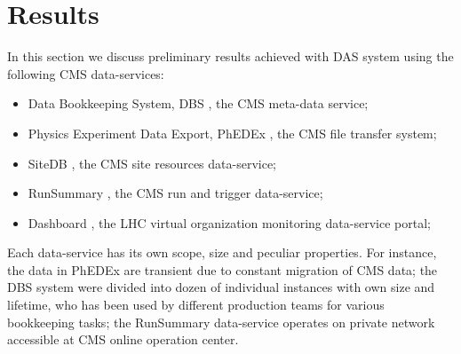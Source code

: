 \documentclass[1p,times]{elsarticle}
\begin{document}
\section{Results\label{Results}}
In this section we discuss preliminary results achieved with DAS system
using the following CMS data-services:
\begin{itemize}
\item Data Bookkeeping System, DBS \cite{DBS}, the CMS meta-data service;
\item Physics Experiment Data Export, PhEDEx \cite {PhEDEx}, the 
CMS file transfer system;
\item SiteDB \cite{SiteDB}, the CMS site resources data-service;
\item RunSummary \cite{RunSummary}, the CMS run and trigger data-service;
\item Dashboard \cite{Dashboard}, the LHC virtual organization
monitoring data-service portal;
\end{itemize}
Each data-service has its own scope, size and peculiar properties. 
For instance, the data in PhEDEx are transient due to constant 
migration of CMS data; the DBS system were divided into dozen 
of individual instances with own size and lifetime, who has been used by different production 
teams for various bookkeeping tasks; the RunSummary data-service
operates on private network accessible at CMS online operation center.

\end{document}
